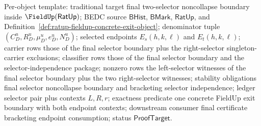 Per-object template: traditional target final two-selector noncollapse boundary
inside $\FieldUp(\mathsf{RatUp})$; BEDC source $\mathsf{BHist}$,
$\mathsf{BMark}$, $\mathsf{RatUp}$, and
Definition~\ref{def:ratup-fieldup-concrete-exit-object}; denominator tuple
$(C_D^u,R_D^u,\mu_D^u,e_D^u,N_D^u)$; selected endpoints
$E_s(h,k,\ell)$ and $E_t(h,k,\ell)$; carrier rows those of the final selector
boundary plus the right-selector singleton-carrier exclusions; classifier rows
those of the final selector boundary and the selector-independence package;
nonzero rows the left-selector witnesses of the final selector boundary plus
the two right-selector witnesses; stability obligations final selector
noncollapse boundary and bracketing selector independence; ledger selector pair
plus contexts $L,R,r$; exactness predicate one concrete FieldUp exit boundary
with both endpoint contexts; downstream consumer final certificate bracketing
endpoint consumption; status $\mathsf{ProofTarget}$.

